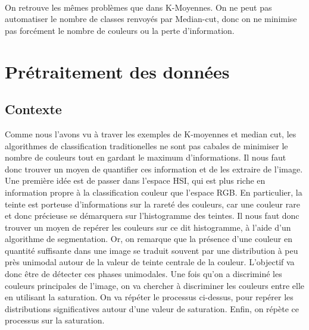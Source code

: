 \documentclass{article}
\begin{document}
 \\
On retrouve les mêmes problèmes que dans K-Moyennes. On ne peut pas automatiser le nombre de classes renvoyés par Median-cut, donc on ne minimise pas forcément le nombre de couleurs ou la perte d'information. 
\section{Prétraitement des données}
\subsection{Contexte}
Comme nous l'avons vu à traver les exemples de K-moyennes et median cut, les algorithmes de classification traditionelles ne sont pas cabales de minimiser le nombre de couleurs tout en gardant le maximum d'informations. Il nous faut donc trouver un moyen de quantifier ces information et de les extraire de l'image. Une première idée est de passer dans l'espace HSI, qui est plus riche en information propre à la classification couleur que l'espace RGB. En particulier, la teinte est porteuse d'informations sur la rareté des couleurs, car une couleur rare et donc précieuse se démarquera sur l'histogramme des teintes. Il nous faut donc trouver un moyen de repérer les couleurs sur ce dit histogramme, à l'aide d'un algorithme de segmentation. Or, on remarque que la présence d'une couleur en quantité suffisante dans une image se traduit souvent par une distribution à peu près unimodal autour de la valeur de teinte centrale de la couleur. L'objectif va donc être de détecter ces phases unimodales. Une fois qu'on a discriminé les couleurs principales de l'image, on va chercher à discriminer les couleurs entre elle en utilisant la saturation. On va répéter le processus ci-dessus, pour repérer les distributions significatives autour d'une valeur de saturation. Enfin, on répète ce processus sur la saturation. 
\end{document}
